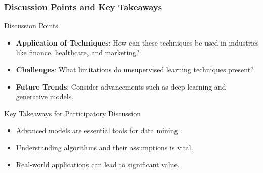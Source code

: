 \documentclass[aspectratio=169]{beamer}
\begin{document}
\begin{frame}[fragile]
    \frametitle{Discussion Points and Key Takeaways}
    \begin{block}{Discussion Points}
        \begin{itemize}
            \item \textbf{Application of Techniques}: How can these techniques be used in industries like finance, healthcare, and marketing?
            \item \textbf{Challenges}: What limitations do unsupervised learning techniques present?
            \item \textbf{Future Trends}: Consider advancements such as deep learning and generative models.
        \end{itemize}
    \end{block}

    \begin{block}{Key Takeaways for Participatory Discussion}
        \begin{itemize}
            \item Advanced models are essential tools for data mining.
            \item Understanding algorithms and their assumptions is vital.
            \item Real-world applications can lead to significant value.
        \end{itemize}
    \end{block}
\end{frame}
\end{document}
